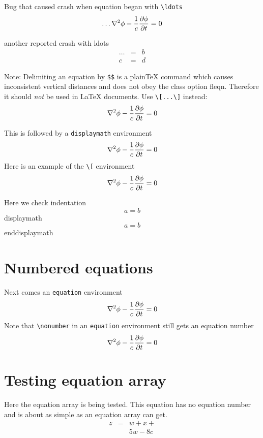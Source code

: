 \documentclass{article}
\begin{document}
Bug that caused crash when equation began with \verb#\ldots#
$$
\ldots\nabla^2 \phi -{1\over c} {\partial \phi\over \partial t}  = 0
$$

another reported crash with ldots
\begin{eqnarray*} 
\ldots & = & b \\
c      & = & d
\end{eqnarray*} 

Note: Delimiting an equation by \verb|$$| is a plain\TeX{} command
which causes inconsistent vertical distances and does not obey
the class option \textsf{fleqn}.
Therefore it should \emph{not} be used in \LaTeX{} documents. Use
\verb#\[...\]# instead:
\[
\nabla^2 \phi -{1\over c} {\partial \phi\over \partial t}  = 0
\]


This is followed by a \verb#displaymath# environment
\begin{displaymath}
\nabla^2 \phi -{1\over c} {\partial \phi\over \partial t}  = 0
\end{displaymath}
Here is an example of the \verb#\[# environment
\[
\nabla^2 \phi -{1\over c} {\partial \phi\over \partial t}  = 0
\]

\noindent 
Here we check indentation
\[ 
a=b 
\] 
displaymath 
\begin{displaymath} 
a=b 
\end{displaymath} 
enddisplaymath 


\section{Numbered equations}
Next comes an \verb#equation# environment
\begin{equation}
\nabla^2 \phi -{1\over c} {\partial \phi\over \partial t}  = 0
\end{equation}
Note that \verb#\nonumber# in an \verb#equation# environment still gets
an equation number
\begin{equation}
\nabla^2 \phi -{1\over c} {\partial \phi\over \partial t}  = 0 \nonumber
\end{equation}

\section{Testing equation array}

Here the equation array is being tested.  This equation has no equation number
and is about as simple as an equation array can get.
\begin{eqnarray*}
z & = & w + x + \\
  &   & 5w - 8c 
\end{eqnarray*}
\end{document}
